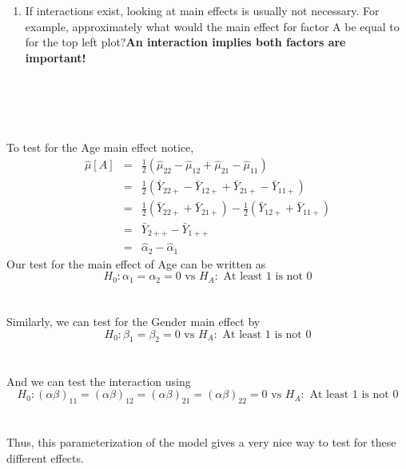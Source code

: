 \begin{enumerate}
\begin{enumerate}
\begin{center}
\end{center}
\item If interactions exist, looking at main effects is usually not necessary.  For example, approximately what would the main effect for factor A be equal to for the top left plot?\textbf{An interaction implies both factors are important!}  \\~\\~\\~\\~\\
\end{enumerate}
\end{enumerate}

\newpage

To test for the Age main effect notice, 
\begin{eqnarray*}
\hat{\mu}[A]&=&\frac{1}{2}(\hat{\mu}_{22}-\hat{\mu}_{12}+\hat{\mu}_{21}-\hat{\mu}_{11})\\
&= & \frac{1}{2}(\bar{Y}_{22+}-\bar{Y}_{12+}+\bar{Y}_{21+}-\bar{Y}_{11+})\\
& = & \frac{1}{2}(\bar{Y}_{22+}+\bar{Y}_{21+})-\frac{1}{2}(\bar{Y}_{12+}+\bar{Y}_{11+})\\
& = & \bar{Y}_{2++}-\bar{Y}_{1++} \\
&=& \hat{\alpha}_{2}-\hat{\alpha}_{1}
\end{eqnarray*}
Our test for the main effect of Age can be written as
$$H_0: \alpha_{1}=\alpha_{2}=0\mbox{ vs } H_A:\mbox{ At least 1 is not 0}$$~\\~\\
Similarly, we can test for the Gender main effect by
$$H_0: \beta_{1}=\beta_{2}=0\mbox{ vs } H_A:\mbox{ At least 1 is not 0}$$~\\~\\
And we can test the interaction using 
$$H_0: (\alpha\beta)_{11}=(\alpha\beta)_{12}=(\alpha\beta)_{21}=(\alpha\beta)_{22}=0\mbox{ vs } H_A:\mbox{ At least 1 is not 0}$$~\\~\\
Thus, this parameterization of the model gives a very nice way to test for these different effects.

